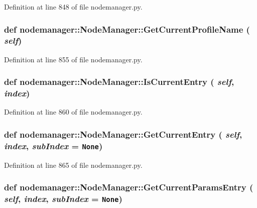 Definition at line 848 of file nodemanager.py.\hypertarget{classnodemanager_1_1NodeManager_eee0741327de398df87e8916995ad8f5}{
\subsubsection[GetCurrentProfileName]{\setlength{\rightskip}{0pt plus 5cm}def nodemanager::Node\-Manager::Get\-Current\-Profile\-Name ( {\em self})}}
\label{classnodemanager_1_1NodeManager_eee0741327de398df87e8916995ad8f5}




Definition at line 855 of file nodemanager.py.\hypertarget{classnodemanager_1_1NodeManager_97c725e85f609c7b5a17ff95dbb08aea}{
\subsubsection[IsCurrentEntry]{\setlength{\rightskip}{0pt plus 5cm}def nodemanager::Node\-Manager::Is\-Current\-Entry ( {\em self},  {\em index})}}
\label{classnodemanager_1_1NodeManager_97c725e85f609c7b5a17ff95dbb08aea}




Definition at line 860 of file nodemanager.py.\hypertarget{classnodemanager_1_1NodeManager_583794f09cbd29d97ba0cf0c43acfc85}{
\subsubsection[GetCurrentEntry]{\setlength{\rightskip}{0pt plus 5cm}def nodemanager::Node\-Manager::Get\-Current\-Entry ( {\em self},  {\em index},  {\em sub\-Index} = {\tt None})}}
\label{classnodemanager_1_1NodeManager_583794f09cbd29d97ba0cf0c43acfc85}




Definition at line 865 of file nodemanager.py.\hypertarget{classnodemanager_1_1NodeManager_92f2a252611dc624b8dca4df6b4fe1cb}{
\subsubsection[GetCurrentParamsEntry]{\setlength{\rightskip}{0pt plus 5cm}def nodemanager::Node\-Manager::Get\-Current\-Params\-Entry ( {\em self},  {\em index},  {\em sub\-Index} = {\tt None})}}
\label{classnodemanager_1_1NodeManager_92f2a252611dc624b8dca4df6b4fe1cb}




